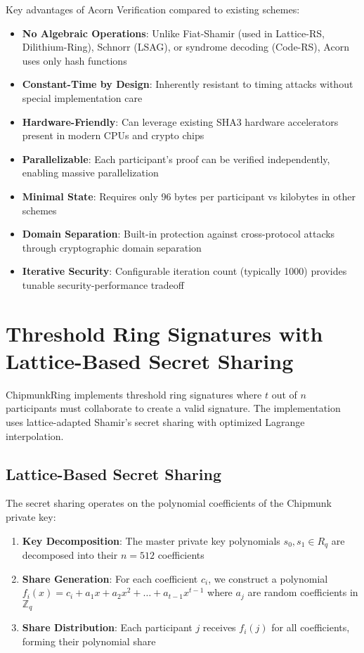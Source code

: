 \documentclass[11pt,a4paper]{article}
\begin{document}
Key advantages of Acorn Verification compared to existing schemes:

\begin{itemize}
\item \textbf{No Algebraic Operations}: Unlike Fiat-Shamir (used in Lattice-RS, Dilithium-Ring), Schnorr (LSAG), or syndrome decoding (Code-RS), Acorn uses only hash functions
\item \textbf{Constant-Time by Design}: Inherently resistant to timing attacks without special implementation care
\item \textbf{Hardware-Friendly}: Can leverage existing SHA3 hardware accelerators present in modern CPUs and crypto chips
\item \textbf{Parallelizable}: Each participant's proof can be verified independently, enabling massive parallelization
\item \textbf{Minimal State}: Requires only 96 bytes per participant vs kilobytes in other schemes
\item \textbf{Domain Separation}: Built-in protection against cross-protocol attacks through cryptographic domain separation
\item \textbf{Iterative Security}: Configurable iteration count (typically 1000) provides tunable security-performance tradeoff
\end{itemize}

\section{Threshold Ring Signatures with Lattice-Based Secret Sharing}

ChipmunkRing implements threshold ring signatures where $t$ out of $n$ participants must collaborate to create a valid signature. The implementation uses lattice-adapted Shamir's secret sharing with optimized Lagrange interpolation.

\subsection{Lattice-Based Secret Sharing}

The secret sharing operates on the polynomial coefficients of the Chipmunk private key:

\begin{enumerate}
\item \textbf{Key Decomposition}: The master private key polynomials $s_0, s_1 \in R_q$ are decomposed into their $n = 512$ coefficients
\item \textbf{Share Generation}: For each coefficient $c_i$, we construct a polynomial $f_i(x) = c_i + a_1x + a_2x^2 + \ldots + a_{t-1}x^{t-1}$ where $a_j$ are random coefficients in $\mathbb{Z}_q$
\item \textbf{Share Distribution}: Each participant $j$ receives $f_i(j)$ for all coefficients, forming their polynomial share
\end{enumerate}
\end{document}
